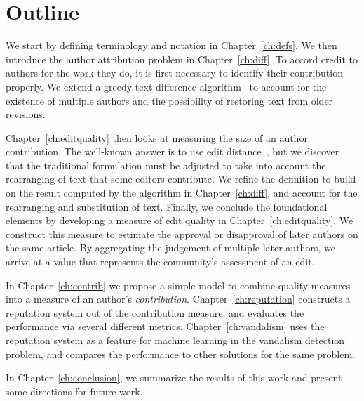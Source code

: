 \section{Outline}

We start by defining terminology and notation in Chapter~\ref{ch:defs}.
We then introduce the author attribution problem in Chapter~\ref{ch:diff}.
To accord credit to authors for the work they do,
it is first necessary to identify their contribution properly.
We extend a greedy text difference algorithm~\cite{Reichenberger1991,Burns1997} to
account for the existence of multiple authors and the possibility
of restoring text from older revisions.

Chapter~\ref{ch:editquality} then looks at measuring the size of
an author contribution.
The well-known answer is to use edit distance~\cite{Levenshtein1966},
but we discover that the traditional formulation must be adjusted
to take into account the rearranging of text that some editors contribute.
We refine the definition to build on the result computed by the
algorithm in Chapter~\ref{ch:diff}, and account for the rearranging
and substitution of text.
Finally, we conclude the foundational elements by developing a measure
of edit quality in Chapter~\ref{ch:editquality}.
We construct this measure to estimate the approval or disapproval of
later authors on the same article.
By aggregating the judgement of multiple later authors, we arrive at
a value that represents the community's assessment of an edit.

In Chapter~\ref{ch:contrib} we propose a simple model to combine
quality measures into a measure of an author's \textit{contribution}.
Chapter~\ref{ch:reputation} constructs a reputation system
out of the contribution measure, and evaluates the performance
via several different metrics.
Chapter~\ref{ch:vandalism} uses the reputation system as a feature
for machine learning in the vandalism detection problem, and compares
the performance to other solutions for the same problem.

In Chapter~\ref{ch:conclusion}, we summarize the results of this work
and present some directions for future work.

